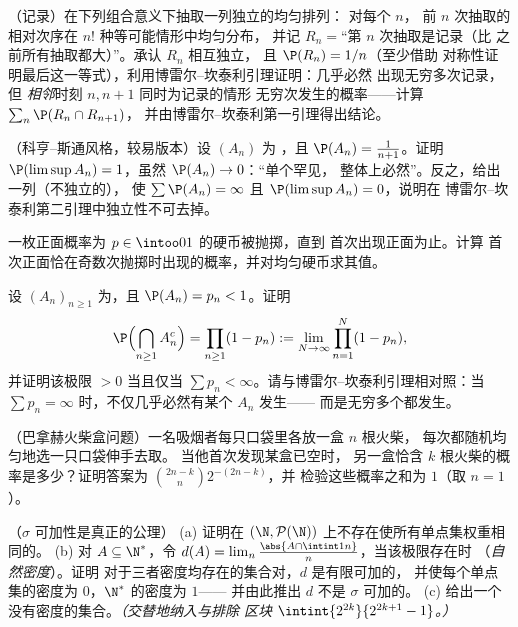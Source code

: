 \begin{exercise}[$\star\star\star$]\label{exo:b2:proba:7}
（记录）在下列组合意义下抽取一列独立的均匀排列：
对每个 $n$，
前 $n$ 次抽取的相对次序在 $n!$ 种等可能情形中均匀分布，
并记 $R_n = {}$“第 $n$ 次抽取是记录（比
之前所有抽取都大）”。承认 $R_n$ 相互独立，
且 $\P(R_n) = 1/n$（至少借助
对称性证明最后这一等式），利用博雷尔–坎泰利引理证明：几乎必然
出现无穷多次记录，但
\emph{相邻}时刻 $n, n+1$ 同时为记录的情形
无穷次发生的概率——计算 $\sum_n \P(R_n \cap R_{n+1})$，
并由博雷尔–坎泰利第一引理得出结论。
\end{exercise}

\begin{exercise}[$\star\star\star$]\label{exo:b2:proba:8}
（科亨–斯通风格，较易版本）设 $(A_n)$ 为
，且 $\P(A_n) = \frac{1}{n+1}$。证明
$\P(\limsup A_n) = 1$，虽然 $\P(A_n) \to 0$：“单个罕见，
整体上必然”。反之，给出一列（不独立的），
使 $\sum\P(A_n) = \infty$ 且
$\P(\limsup A_n) = 0$，说明在
博雷尔–坎泰利第二引理中独立性不可去掉。
\end{exercise}

\begin{exercise}[$\star$]\label{exo:b2:proba:9}
一枚正面概率为 $p \in \intoo01$ 的硬币被抛掷，直到
首次出现正面为止。计算
首次正面恰在奇数次抛掷时出现的概率，并对均匀硬币求其值。
\end{exercise}

\begin{exercise}[$\star\star$]\label{exo:b2:proba:10}
设 $(A_n)_{n\geq1}$ 为，且 $\P(A_n) =
p_n < 1$。证明
\[
\P\Bigl(\bigcap_{n\geq1}A_n^c\Bigr)
= \prod_{n\geq1}(1 - p_n)
:= \lim_{N\to\infty}\prod_{n=1}^N(1 - p_n),
\]
并证明该极限 $> 0$ 当且仅当 $\sum p_n <
\infty$。请与博雷尔–坎泰利引理相对照：当 $\sum p_n =
\infty$ 时，不仅几乎必然有某个 $A_n$ 发生——
而是无穷多个都发生。
\end{exercise}

\begin{exercise}[$\star\star$]\label{exo:b2:proba:11}
（巴拿赫火柴盒问题）一名吸烟者每只口袋里各放一盒 $n$ 根火柴，
每次都随机均匀地选一只口袋伸手去取。
当他首次发现某盒已空时，
另一盒恰含 $k$ 根火柴的概率是多少？证明答案为
$\binom{2n-k}{n}2^{-(2n-k)}$，并
检验这些概率之和为 $1$（取 $n = 1$）。
\end{exercise}

\begin{exercise}[$\star\star\star$]\label{exo:b2:proba:12}
（$\sigma$ 可加性是真正的公理）
(a) 证明在 $(\N,
\mathcal P(\N))$ 上不存在使所有单点集权重相同的。
(b) 对 $A \subseteq \N^*$，令 $d(A) =
\lim_n\frac{\abs{A\cap\intint1n}}{n}$，当该极限存在时
（\emph{自然密度}）。证明
对于三者密度均存在的集合对，$d$ 是有限可加的，
并使每个单点集的密度为 $0$，$\N^*$ 的密度为 $1$——
并由此推出 $d$ 不是 $\sigma$ 可加的。
(c) 给出一个没有密度的集合。\emph{（交替地纳入与排除
区块 $\intint{2^{2k}}{2^{2k+1}-1}$。）}
\end{exercise}

